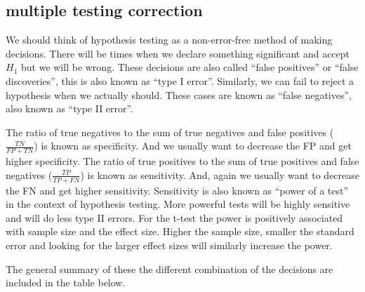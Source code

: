 \documentclass[12pt,]{krantz}
\begin{document}
\hypertarget{multiple-testing-correction}{%
\subsection{multiple testing correction}\label{multiple-testing-correction}}

We should think of hypothesis testing as a non-error-free method of making
decisions. There will be times when we declare something significant and accept
\(H_1\) but we will be wrong.
These decisions are also called ``false positives'' or ``false discoveries'', this
is also known as ``type I error''. Similarly, we can fail to reject a hypothesis
when we actually should. These cases are known as ``false negatives'', also known
as ``type II error''.

The ratio of true negatives to the sum of
true negatives and false positives (\(\frac{TN}{FP+TN}\)) is known as specificity.
And we usually want to decrease the FP and get higher specificity.
The ratio of true positives to the sum of
true positives and false negatives (\(\frac{TP}{TP+FN}\)) is known as sensitivity.
And, again we usually want to decrease the FN and get higher sensitivity.
Sensitivity is also known as ``power of a test'' in the context of hypothesis
testing. More powerful tests will be highly sensitive and will do less type
II errors. For the t-test the power is positively associated with sample size
and the effect size. Higher the sample size, smaller the standard error and
looking for the larger effect sizes will similarly increase the power.

The general summary of these the different combination of the decisions are
included in the table below.
\end{document}

